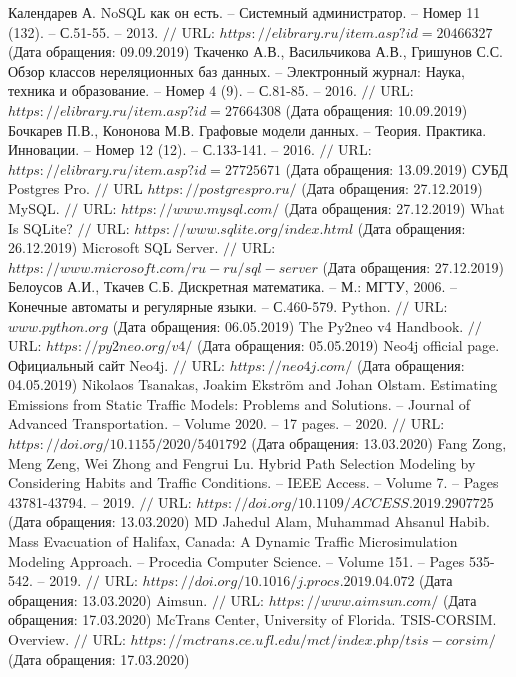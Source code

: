 \begin{thebibliography}{00}
	Календарев А. NoSQL как он есть. -- Системный администратор. -- Номер 11 (132). -- С.51-55. -- 2013. $//$ URL: $https://elibrary.ru/item.asp?id=20466327$ (Дата обращения: 09.09.2019)
	Ткаченко А.В., Васильчикова А.В., Гришунов С.С. Обзор классов нереляционных баз данных. -- Электронный журнал: Наука, техника и образование. -- Номер 4 (9). -- С.81-85. -- 2016. $//$ URL: $https://elibrary.ru/item.asp?id=27664308$ (Дата обращения: 10.09.2019)
	Бочкарев П.В., Кононова М.В. Графовые модели данных. -- Теория. Практика. Инновации. -- Номер 12 (12). -- С.133-141. -- 2016. $//$ URL: $https://elibrary.ru/item.asp?id=27725671$ (Дата обращения: 13.09.2019)
	СУБД Postgres Pro. $//$ URL $https://postgrespro.ru/$ (Дата обращения: 27.12.2019)
	MySQL. $//$ URL: $https://www.mysql.com/$ (Дата обращения: 27.12.2019)
	What Is SQLite? $//$ URL: $https://www.sqlite.org/index.html$ (Дата обращения: 26.12.2019)
	Microsoft SQL Server. $//$ URL: $https://www.microsoft.com/ru-ru/sql-server$ (Дата обращения: 27.12.2019)
	Белоусов А.И., Ткачев С.Б. Дискретная математика. -- М.: МГТУ, 2006. -- Конечные автоматы и регулярные языки. -- С.460-579.
	Python. $//$ URL: $www.python.org$ (Дата обращения: 06.05.2019)
	The Py2neo v4 Handbook. $//$ URL: $https://py2neo.org/v4/$ (Дата обращения: 05.05.2019)
	Neo4j official page. Официальный сайт Neo4j. $//$ URL: $https://neo4j.com/$ (Дата обращения: 04.05.2019)
	Nikolaos Tsanakas, Joakim Ekström and Johan Olstam. Estimating Emissions from Static Traffic Models: Problems and Solutions. -- Journal of Advanced Transportation. -- Volume 2020. -- 17 pages. -- 2020. $//$ URL: $https://doi.org/10.1155/2020/5401792$ (Дата обращения: 13.03.2020)
	Fang Zong, Meng Zeng, Wei Zhong and Fengrui Lu. Hybrid Path Selection Modeling by Considering Habits and Traffic Conditions. -- IEEE Access. -- Volume 7. -- Pages 43781-43794. -- 2019. $//$ URL: $https://doi.org/10.1109/ACCESS.2019.2907725$ (Дата обращения: 13.03.2020)
	MD Jahedul Alam, Muhammad Ahsanul Habib. Mass Evacuation of Halifax, Canada: A Dynamic Traffic Microsimulation Modeling Approach. -- Procedia Computer Science. -- Volume 151. -- Pages 535-542. -- 2019. $//$ URL: $https://doi.org/10.1016/j.procs.2019.04.072$ (Дата обращения: 13.03.2020)
	Aimsun. $//$ URL: $https://www.aimsun.com/$ (Дата обращения: 17.03.2020)
	McTrans Center, University of Florida. TSIS-CORSIM. Overview. $//$ URL: $https://mctrans.ce.ufl.edu/mct/index.php/tsis-corsim/$ (Дата обращения: 17.03.2020)

\end{thebibliography}
